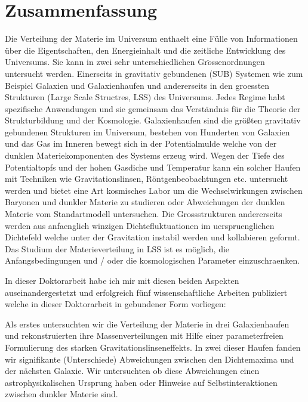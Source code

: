 {}

\chapter*{Zusammenfassung}%



Die Verteilung der Materie im Universum enthaelt eine Fülle von Informationen über die Eigentschaften, den Energieinhalt und die zeitliche Entwicklung des Universums.
Sie kann in zwei sehr unterschiedlichen Gr$\ddot{o}$ssenordnungen untersucht werden. Einerseits in gravitativ gebundenen (SUB) Systemen wie zum Beispiel Galaxien und Galaxienhaufen und andererseits in den groessten  Strukturen (Large Scale Structres, LSS) des Universums.
Jedes Regime habt spezifische Anwendungen und sie gemeinsam das Verständnis für die Theorie der
Strukturbildung und der Kosmologie.
Galaxienhaufen sind die größten gravitativ gebundenen Strukturen im Universum, bestehen von Hunderten von Galaxien und das Gas im Inneren bewegt sich in der Potentialmulde welche von der dunklen Materiekomponenten des Systems erzeug wird.
Wegen der Tiefe des Potentialtopfs und der hohen Gasdiche und Temperatur kann ein solcher Haufen mit Techniken wie Gravitationslinsen, Röntgenbeobachtungen etc. untersucht werden und bietet eine Art kosmisches Labor um  die Wechselwirkungen zwischen Baryonen und dunkler Materie zu studieren oder Abweichungen der dunklen Materie vom Standartmodell untersuchen.
Die Grossstrukturen andererseits werden aus anfaenglich winzigen Dichtefluktuationen im uerspruenglichen Dichtefeld welche unter der Gravitation instabil werden und kollabieren geformt. Das Studium der Materieverteilung in LSS ist es möglich, die Anfangsbedingungen und / oder die kosmologischen Parameter einzuschraenken.


In dieser Doktorarbeit habe ich mir mit diesen beiden Aspekten auseinandergestetzt und erfolgreich fünf wissenschaftliche Arbeiten publiziert welche in dieser Doktorarbeit in gebundener Form vorliegen:

Als erstes untersuchten wir die Verteilung der Materie in drei Galaxienhaufen und rekonstruierten ihre Massenverteilungen mit Hilfe einer parameterfreien Formulierung des starken Gravitationslinseneffekts. In zwei dieser Haufen fanden wir signifikante (Unterschiede) Abweichungen zwischen den Dichtemaxima und der nächsten Galaxie. Wir untersuchten ob diese Abweichungen einen astrophysikalischen Ursprung haben oder Hinweise auf Selbstinteraktionen zwischen dunkler Materie sind.

